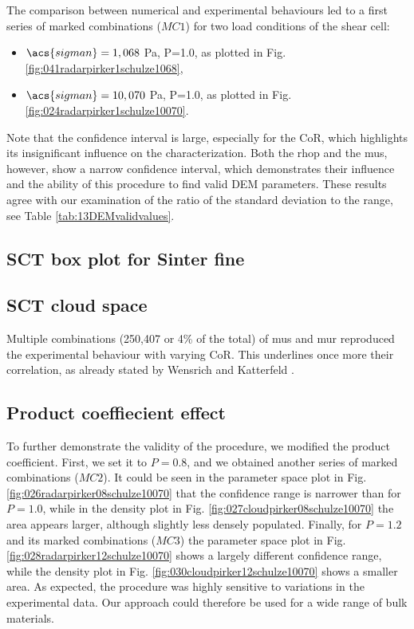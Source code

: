 

The comparison between numerical and experimental behaviours led to a first
series of marked combinations ($MC1$) for two load conditions of
the shear cell:
\begin{itemize}
  \item{$\acs{sigman} = 1,068$ Pa, P=1.0, as plotted in Fig.
  \ref{fig:041radarpirker1schulze1068},}
  \item{$\acs{sigman} = 10,070$ Pa, P=1.0, as plotted in Fig.
  \ref{fig:024radarpirker1schulze10070}.}
\end{itemize}
Note that the confidence interval is large, 
especially for the \acs{CoR}, which highlights its insignificant influence on the
characterization.
Both the \acs{rhop}  and the \acs{mus}, however, show a narrow confidence interval, 
which demonstrates their influence and the ability of this procedure to find
valid \acs{DEM} parameters.
These results agree with our examination of the ratio of the standard deviation
to the range, see Table \ref{tab:13DEMvalidvalues}.

\subsection{SCT box plot for Sinter fine}
\label{subsec:sctboxsinterfine}



\subsection{SCT cloud space}
\label{subsec:sctcloudspace}

Multiple
combinations (250,407 or 4\% of the total) of \acs{mus} and \acs{mur} reproduced
the experimental behaviour with varying \acs{CoR}.
This underlines once more their correlation, as already stated by Wensrich and 
Katterfeld \cite{RefWorks:87}.



\subsection{Product coeffiecient effect}
\label{subsec:productcoeffiecienteffect}

To further demonstrate the validity of the procedure, we modified the product
coefficient. 
First, we set it to $P=0.8$, and we obtained another
series of marked combinations ($MC2$).
It could be seen in the parameter space plot in Fig.
\ref{fig:026radarpirker08schulze10070} that the confidence range is narrower
than for $P=1.0$, while in the density plot in Fig. 
\ref{fig:027cloudpirker08schulze10070} the area
appears larger, although slightly less densely populated. Finally, for $P=1.2$
and its marked combinations ($MC3$) the parameter space plot in Fig.
\ref{fig:028radarpirker12schulze10070} shows a largely different confidence
range, while the density plot in Fig. \ref{fig:030cloudpirker12schulze10070} 
shows a smaller area. As expected, the procedure was highly sensitive to
variations in the experimental data.
Our approach could therefore be used
for a wide range of bulk materials.\\

